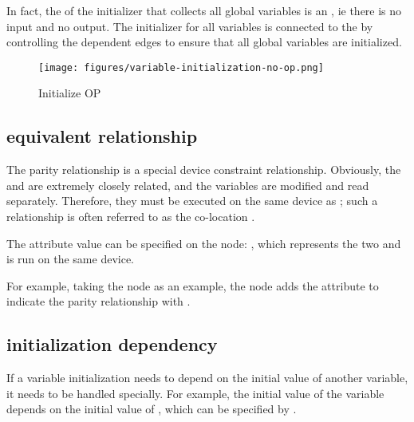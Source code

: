 \begin{content}
In fact, the  of the initializer that collects all global variables is an , ie there is no input and no output. The initializer for all variables is connected to the  by controlling the dependent edges to ensure that all global variables are initialized.

\begin{figure}[!h]
\centering
\texttt{[image: figures/variable-initialization-no-op.png]}
\caption{Initialize OP}
 \label{fig:variable-initialization-no-op}
\end{figure}

\subsection{equivalent relationship}

The parity relationship is a special device constraint relationship. Obviously, the   and  are extremely closely related, and the variables are modified and read separately. Therefore, they must be executed on the same device as ; such a relationship is often referred to as the co-location .

The  attribute value can be specified on the  node: \code{[s: "loc:@W"]}, which represents the two  and  is run on the same device.

For example, taking the  node as an example, the node adds the  attribute to indicate the parity relationship with .


\subsection{initialization dependency}

If a variable initialization needs to depend on the initial value of another variable, it needs to be handled specially. For example, the initial value of the variable  depends on the initial value of , which can be specified by .


\end{content}

